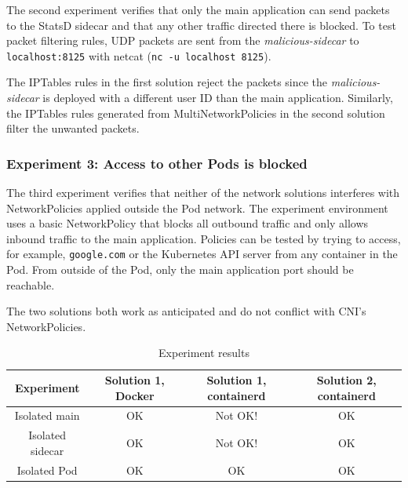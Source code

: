 \documentclass[english, 12pt, a4paper, sci, utf8, a-2b, online]{aaltothesis}
\begin{document}
The second experiment verifies that only the main application can send packets to the StatsD sidecar and that any other traffic directed there is blocked.
To test packet filtering rules, UDP packets are sent from the \emph{malicious-sidecar} to \lstinline{localhost:8125} with netcat (\lstinline{nc -u localhost 8125}).

The IPTables rules in the first solution reject the packets since the \emph{malicious-sidecar} is deployed with a different user ID than the main application.
Similarly, the IPTables rules generated from MultiNetworkPolicies in the second solution filter the unwanted packets.

\subsubsection{Experiment 3: Access to other Pods is blocked}

The third experiment verifies that neither of the network solutions interferes with NetworkPolicies applied outside the Pod network.
The experiment environment uses a basic NetworkPolicy that blocks all outbound traffic and only allows inbound traffic to the main application.
Policies can be tested by trying to access, for example, \lstinline{google.com} or the Kubernetes API server from any container in the Pod.
From outside of the Pod, only the main application port should be reachable.

The two solutions both work as anticipated and do not conflict with CNI's NetworkPolicies.

\begin{table}[H]
  \sffamily
  \centering
  \caption{Experiment results}
  \label{table:evaluation-results}

  \begin{minipage}{\textwidth}
  \renewcommand{\thempfootnote}{\arabic{mpfootnote}}
  \begin{tabularx}{\textwidth}{CCCC}
    \textbf{Experiment} & \textbf{Solution 1, Docker} & \textbf{Solution 1, containerd} & \textbf{Solution 2, containerd} \\ \hline
    Isolated main & OK & Not OK! & OK \\ \hline
    Isolated sidecar & OK & Not OK! & OK \\ \hline
    Isolated Pod & OK & OK & OK \\ \hline
  \end{tabularx}
  \end{minipage}
\end{table}
\end{document}
